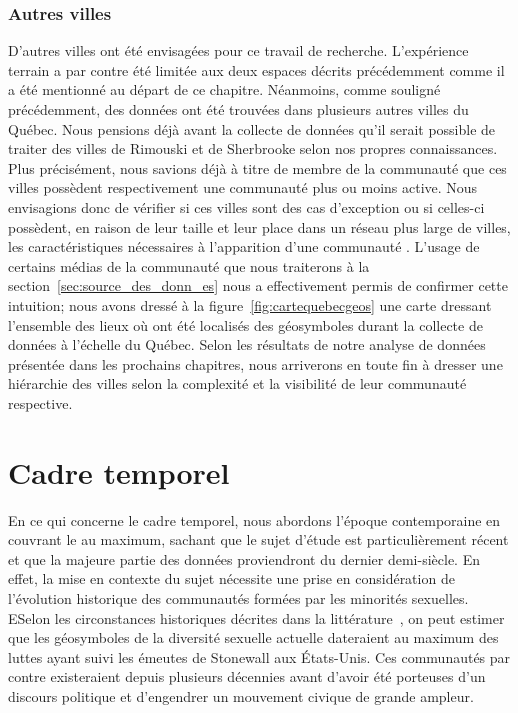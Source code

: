 \subsubsection{Autres villes}
\label{ssub:autres_villes}
D'autres villes ont été envisagées pour ce travail de recherche.
L'expérience terrain a par contre été limitée aux deux espaces décrits précédemment comme il a été mentionné au départ de ce chapitre.
Néanmoins, comme souligné précédemment, des données ont été trouvées dans plusieurs autres villes du Québec.
Nous pensions déjà avant la collecte de données qu'il serait possible de traiter des villes de Rimouski et de Sherbrooke selon nos propres connaissances.
Plus précisément, nous savions déjà à titre de membre de la communauté \lgbt{} que ces villes possèdent respectivement une communauté plus ou moins active.
Nous envisagions donc de vérifier si ces villes sont des cas d'exception ou si celles-ci possèdent, en raison de leur taille et leur place dans un réseau plus large de villes, les caractéristiques nécessaires à l'apparition d'une communauté \lgbt.
L'usage de certains médias de la communauté que nous traiterons à la section~\ref{sec:source_des_donn_es} nous a effectivement permis de confirmer cette intuition; nous avons dressé à la figure~\ref{fig:cartequebecgeos} une carte dressant l'ensemble des lieux où ont été localisés des géosymboles durant la collecte de données à l'échelle du Québec.
Selon les résultats de notre analyse de données présentée dans les prochains chapitres, nous arriverons en toute fin à dresser une hiérarchie des villes selon la complexité et la visibilité de leur communauté respective.

\section{Cadre temporel}
\label{sec:cadre_temporel}
En ce qui concerne le cadre temporel, nous abordons l'époque contemporaine en couvrant le  au maximum, sachant que le sujet d'étude est particulièrement récent et que la majeure partie des données proviendront du dernier demi-siècle.
En effet, la mise en contexte du sujet nécessite une prise en considération de l'évolution historique des communautés formées par les minorités sexuelles.
ESelon les circonstances historiques décrites dans la littérature~\citep{Spencer2005}, on peut estimer que les géosymboles de la diversité sexuelle actuelle dateraient au maximum des luttes ayant suivi les émeutes de Stonewall aux États-Unis.
Ces communautés par contre existeraient depuis plusieurs décennies avant d'avoir été porteuses d'un discours politique et d'engendrer un mouvement civique de grande ampleur.

